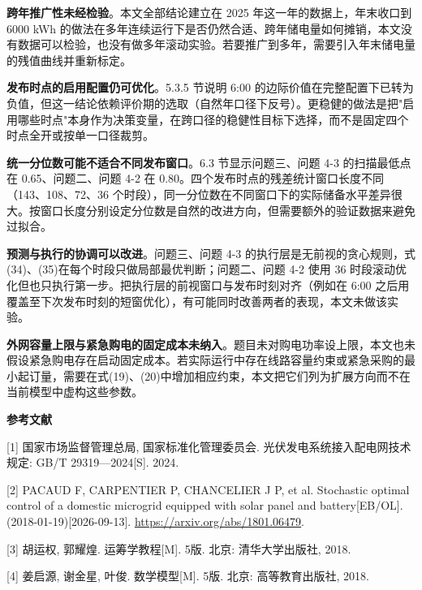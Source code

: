 \documentclass[12pt,a4paper]{ctexart}
\begin{document}
\textbf{跨年推广性未经检验}。本文全部结论建立在 2025 年这一年的数据上，年末收口到 6000 kWh 的做法在多年连续运行下是否仍然合适、跨年储电量如何摊销，本文没有数据可以检验，也没有做多年滚动实验。若要推广到多年，需要引入年末储电量的残值曲线并重新标定。

\textbf{发布时点的启用配置仍可优化}。5.3.5 节说明 6:00 的边际价值在完整配置下已转为负值，但这一结论依赖评价期的选取（自然年口径下反号）。更稳健的做法是把"启用哪些时点"本身作为决策变量，在跨口径的稳健性目标下选择，而不是固定四个时点全开或按单一口径裁剪。

\textbf{统一分位数可能不适合不同发布窗口}。6.3 节显示问题三、问题 4-3 的扫描最低点在 0.65、问题二、问题 4-2 在 0.80。四个发布时点的残差统计窗口长度不同（143、108、72、36 个时段），同一分位数在不同窗口下的实际储备水平差异很大。按窗口长度分别设定分位数是自然的改进方向，但需要额外的验证数据来避免过拟合。

\textbf{预测与执行的协调可以改进}。问题三、问题 4-3 的执行层是无前视的贪心规则，式(34)、(35)在每个时段只做局部最优判断；问题二、问题 4-2 使用 36 时段滚动优化但也只执行第一步。把执行层的前视窗口与发布时刻对齐（例如在 6:00 之后用覆盖至下次发布时刻的短窗优化），有可能同时改善两者的表现，本文未做该实验。

\textbf{外网容量上限与紧急购电的固定成本未纳入}。题目未对购电功率设上限，本文也未假设紧急购电存在启动固定成本。若实际运行中存在线路容量约束或紧急采购的最小起订量，需要在式(19)、(20)中增加相应约束，本文把它们列为扩展方向而不在当前模型中虚构这些参数。

\clearpage\begin{center}\heiti\bfseries{}参考文献\end{center}

{\footnotesize\noindent\hangindent=0.65cm [1] 国家市场监督管理总局, 国家标准化管理委员会. 光伏发电系统接入配电网技术规定: GB/T 29319—2024[S]. 2024.\par}

{\footnotesize\noindent\hangindent=0.65cm [2] PACAUD F, CARPENTIER P, CHANCELIER J P, et al. Stochastic optimal control of a domestic microgrid equipped with solar panel and battery[EB/OL]. (2018-01-19)[2026-09-13]. \url{https://arxiv.org/abs/1801.06479}.\par}

{\footnotesize\noindent\hangindent=0.65cm [3] 胡运权, 郭耀煌. 运筹学教程[M]. 5版. 北京: 清华大学出版社, 2018.\par}

{\footnotesize\noindent\hangindent=0.65cm [4] 姜启源, 谢金星, 叶俊. 数学模型[M]. 5版. 北京: 高等教育出版社, 2018.\par}
\end{document}

